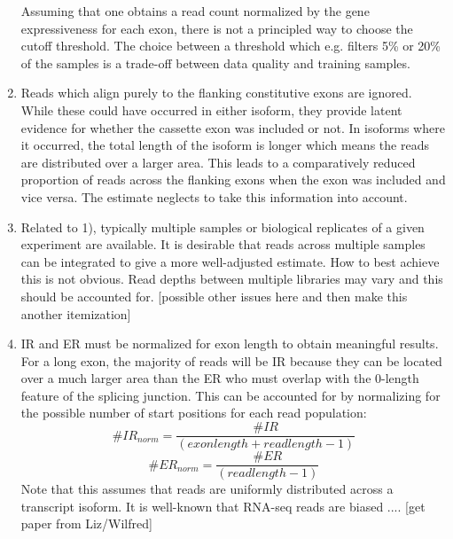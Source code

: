 \begin{enumerate}
	Assuming that one obtains a read count normalized by the gene expressiveness for each exon, there is not a principled way to choose the cutoff threshold. The choice between a threshold which e.g. filters 5\% or 20\% of the samples is a trade-off between data quality and training samples.
	\item Reads which align purely to the flanking constitutive exons are ignored. While these could have occurred in either isoform, they provide latent evidence for whether the cassette exon was included or not. In isoforms where it occurred, the total length of the isoform is longer which means the reads are distributed over a larger area. This leads to a comparatively reduced proportion of reads across the flanking exons when the exon was included and vice versa. The estimate neglects to take this information into account.
	\item Related to 1), typically multiple samples or biological replicates of a given experiment are available. It is desirable that reads across multiple samples can be integrated to give a more well-adjusted estimate. How to best achieve this is not obvious. Read depths between multiple libraries may vary and this should be accounted for. [possible other issues here and then make this another itemization]
	\item IR and ER must be normalized for exon length to obtain meaningful results. For a long exon, the majority of reads will be IR because they can be located over a much larger area than the ER who must overlap with the 0-length feature of the splicing junction. This can be accounted for by normalizing for the possible number of start positions for each read population:
	$$\#IR_{norm} = \frac{\#IR}{(exon length + read length -1)}$$
	$$\#ER_{norm} = \frac{\#ER}{(read length - 1)}$$
	Note that this assumes that reads are uniformly distributed across a transcript isoform. It is well-known that RNA-seq reads are biased .... [get paper from Liz/Wilfred]
	
\end{enumerate}




